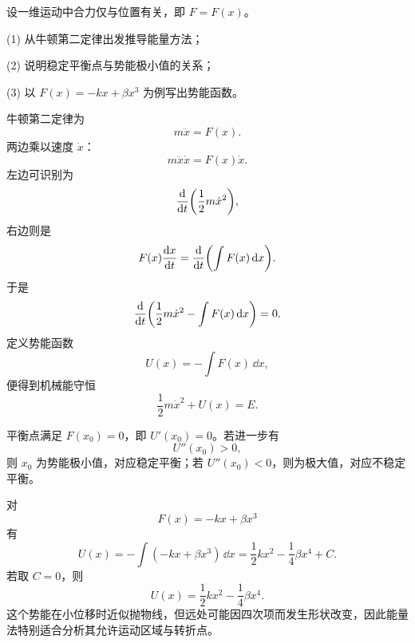 \begin{problem}
设一维运动中合力仅与位置有关，即 $F=F(x)$。

(1) 从牛顿第二定律出发推导能量方法；

(2) 说明稳定平衡点与势能极小值的关系；

(3) 以 $F(x)=-kx+\beta x^3$ 为例写出势能函数。

\begin{solution}
牛顿第二定律为
\[
m\ddot x=F(x).
\]
两边乘以速度 $\dot x$：
\[
m\ddot x\dot x=F(x)\dot x.
\]
左边可识别为
\[
\frac{\dd}{\dd t}\qty(\frac12 m\dot x^2),
\]
右边则是
\[
F(x)\dv{x}{t}=\dv{}{t}\qty(\int F(x)\,\dd x).
\]
于是
\[
\frac{\dd}{\dd t}\qty(\frac12 m\dot x^2-\int F(x)\,\dd x)=0.
\]
定义势能函数
\[
U(x)=-\int F(x)\,\dd x,
\]
便得到机械能守恒
\[
\frac12 m\dot x^2+U(x)=E.
\]

平衡点满足 $F(x_0)=0$，即 $U'(x_0)=0$。若进一步有
\[
U''(x_0)>0,
\]
则 $x_0$ 为势能极小值，对应稳定平衡；若 $U''(x_0)<0$，则为极大值，对应不稳定平衡。

对
\[
F(x)=-kx+\beta x^3
\]
有
\[
U(x)=-\int(-kx+\beta x^3)\,\dd x=\frac12 kx^2-\frac14 \beta x^4+C.
\]
若取 $C=0$，则
\[
U(x)=\frac12 kx^2-\frac14 \beta x^4.
\]
这个势能在小位移时近似抛物线，但远处可能因四次项而发生形状改变，因此能量法特别适合分析其允许运动区域与转折点。
\end{solution}
\end{problem}
